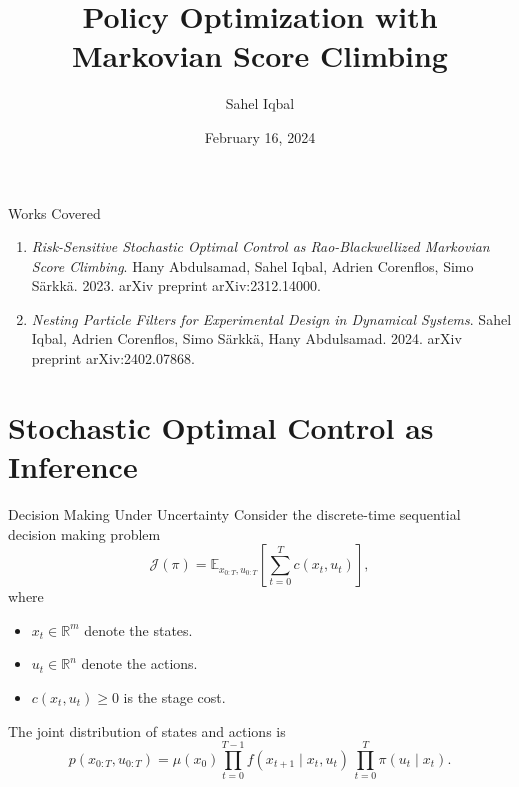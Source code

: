 \documentclass[10pt, aspectratio=1610]{beamer}
\title{Policy Optimization with Markovian Score Climbing}
\date{February 16, 2024}
\author{Sahel Iqbal}
\institute{Aalto University, Finland}
\begin{document}
  \beamertemplatenavigationsymbolsempty
  \maketitle

  
  \begin{frame}{Works Covered}
    \begin{enumerate}
      \item \emph{Risk-Sensitive Stochastic Optimal Control as Rao-Blackwellized Markovian Score Climbing}. Hany Abdulsamad, Sahel Iqbal, Adrien Corenflos, Simo S\"arkk\"a. 2023. arXiv preprint arXiv:2312.14000.
      \item \emph{Nesting Particle Filters for Experimental Design in Dynamical Systems}. Sahel Iqbal, Adrien Corenflos, Simo S\"arkk\"a, Hany Abdulsamad. 2024. arXiv preprint arXiv:2402.07868.
    \end{enumerate}
  \end{frame}

  \section{Stochastic Optimal Control as Inference}
    \begin{frame}{Decision Making Under Uncertainty}
      Consider the discrete-time sequential decision making problem
      \begin{equation}\label{eq:soc_objective}
        \mathcal{J}(\pi) = \mathbb{E}_{x_{0:T}, u_{0:T}} \left[\sum_{t=0}^{T} c(x_t, u_t)\right],
      \end{equation}
      where
      \begin{itemize}
        \item $x_t \in \mathbb{R}^m$ denote the states.
        \item $u_t \in \mathbb{R}^n$ denote the actions.
        \item $c(x_t, u_t) \geq 0$ is the stage cost.
      \end{itemize}
  
      \vskip 1cm
      The joint distribution of states and actions is
      \begin{equation}
          p(x_{0:T}, u_{0:T}) = \mu(x_{0}) \prod_{t=0}^{T-1} f(x_{t+1} \mid x_t, u_t) \, \prod_{t=0}^T \pi(u_t \mid x_t).
      \end{equation}
    \end{frame}
\end{document}
